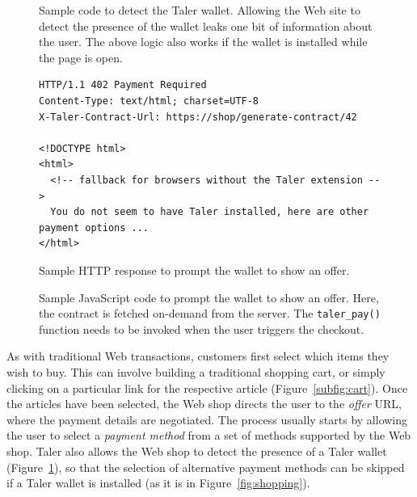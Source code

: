 \documentclass{llncs}
\begin{document}
{}

\begin{figure}[p!]
 \lstset{language=HTML5}
 
 \caption{Sample code to detect the Taler wallet. Allowing the
  Web site to detect the presence of the wallet leaks one bit
  of information about the user. The above logic also works
  if the wallet is installed while the page is open.}
  \label{listing:presence}
\end{figure}


\begin{figure}[p!]
\begin{lstlisting}
HTTP/1.1 402 Payment Required
Content-Type: text/html; charset=UTF-8
X-Taler-Contract-Url: https://shop/generate-contract/42

<!DOCTYPE html>
<html>
  <!-- fallback for browsers without the Taler extension -->
  You do not seem to have Taler installed, here are other payment options ...
</html>
\end{lstlisting}
 \caption{Sample HTTP response to prompt the wallet to show an offer.}
  \label{listing:http-contract}
\end{figure}

\begin{figure}[p!]
 \lstset{language=HTML5}
 
 \caption{Sample JavaScript code to prompt the wallet to show an offer.
          Here, the contract is fetched on-demand from the server.
          The {\tt taler\_pay()} function needs to be invoked
          when the user triggers the checkout.}
 \label{listing:contract}
\end{figure}


As with traditional Web transactions, customers first select which
items they wish to buy.  This can involve building a traditional
shopping cart, or simply clicking on a particular link for the
respective article (Figure~\ref{subfig:cart}).  Once the articles have
been selected, the Web shop directs the user to the {\em offer} URL,
where the payment details are negotiated.  The process usually starts
by allowing the user to select a {\em payment method} from a set of
methods supported by the Web shop.  Taler also allows the Web shop to
detect the presence of a Taler wallet (Figure~\ref{listing:presence}),
so that the selection of alternative payment methods can be skipped if
a Taler wallet is installed (as it is in Figure~\ref{fig:shopping}).
\end{document}
